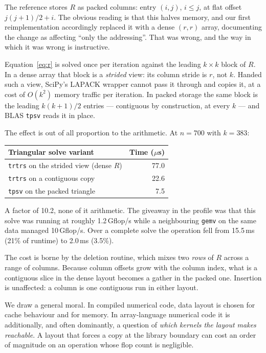 \documentclass[11pt,a4paper]{article}
\theoremstyle{plain}
\theoremstyle{remark}
\begin{document}
The reference stores $R$ as packed columns: entry $(i,j)$, $i \le j$, at flat
offset $j(j+1)/2 + i$. The obvious reading is that this halves memory, and our
first reimplementation accordingly replaced it with a dense $(r, r)$ array,
documenting the change as affecting ``only the addressing''. That was wrong, and
the way in which it was wrong is instructive.

Equation~\eqref{eq:r} is solved once per iteration against the leading $k \times
k$ block of $R$. In a dense array that block is a \emph{strided} view: its
column stride is $r$, not $k$. Handed such a view, SciPy's LAPACK wrapper cannot
pass it through and copies it, at a cost of $O(k^2)$ memory traffic per
iteration. In packed storage the same block is the leading $k(k+1)/2$ entries ---
contiguous by construction, at every $k$ --- and BLAS \texttt{tpsv} reads it in
place.

The effect is out of all proportion to the arithmetic. At $n = 700$ with
$k = 383$:

\begin{center}
\begin{tabular}{lr}
  \toprule
  Triangular solve variant & Time ($\mu$s) \\
  \midrule
  \texttt{trtrs} on the strided view (dense $R$) & 77.0 \\
  \texttt{trtrs} on a contiguous copy            & 22.6 \\
  \texttt{tpsv} on the packed triangle           & 7.5 \\
  \bottomrule
\end{tabular}
\end{center}

\noindent
A factor of 10.2, none of it arithmetic. The giveaway in the profile was
that this solve was running at roughly 1.2\,Gflop/s while a neighbouring
\texttt{gemv} on the same data managed 10\,Gflop/s. Over a complete
solve the operation fell from 15.5\,ms
(21\% of runtime) to 2.0\,ms (3.5\%).

The cost is borne by the deletion routine, which mixes two \emph{rows} of $R$
across a range of columns. Because column offsets grow with the column index,
what is a contiguous slice in the dense layout becomes a gather in the packed
one. Insertion is unaffected: a column is one contiguous run in either layout.

We draw a general moral. In compiled numerical code, data layout is chosen for
cache behaviour and for memory. In array-language numerical code it is
additionally, and often dominantly, a question of \emph{which kernels the layout
makes reachable}. A layout that forces a copy at the library boundary can cost an
order of magnitude on an operation whose flop count is negligible.
\end{document}
